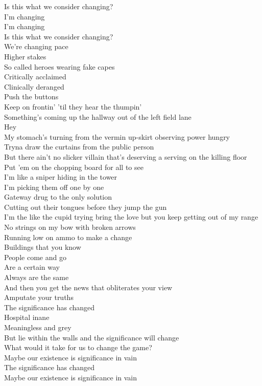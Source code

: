 Is this what we consider changing?\\
I'm changing\\
I'm changing\\
Is this what we consider changing?\\

We're changing pace\\
Higher stakes\\
So called heroes wearing fake capes\\
Critically acclaimed\\
Clinically deranged\\
Push the buttons\\
Keep on frontin' 'til they hear the thumpin'\\
Something's coming up the hallway out of the left field lane\\
Hey\\
My stomach's turning from the vermin up-skirt observing power hungry\\
Tryna draw the curtains from the public person\\
But there ain't no slicker villain that's deserving a serving on the killing floor\\
Put 'em on the chopping board for all to see\\

I'm like a sniper hiding in the tower\\
I'm picking them off one by one\\
Gateway drug to the only solution\\
Cutting out their tongues before they jump the gun\\
I'm the like the cupid trying bring the love but you keep getting out of my range\\
No strings on my bow with broken arrows\\
Running low on ammo to make a change\\

Buildings that you know\\
People come and go\\
Are a certain way\\
Always are the same\\
And then you get the news that obliterates your view\\
Amputate your truths\\
The significance has changed\\

Hospital inane\\
Meaningless and grey\\
But lie within the walls and the significance will change\\
What would it take for us to change the game?\\
Maybe our existence is significance in vain\\
The significance has changed\\
Maybe our existence is significance in vain\\

